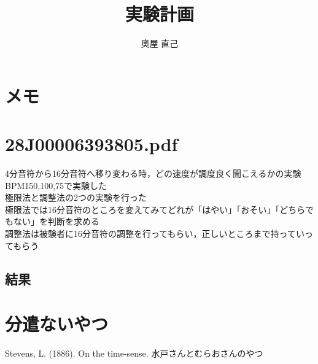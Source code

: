 \documentclass[twocolumn,10pt]{jarticle}
\title{実験計画}
\author{奥屋 直己}
\begin{document}
\maketitle

\section{メモ}
\section{28J00006393805.pdf}
4分音符から16分音符へ移り変わる時，どの速度が調度良く聞こえるかの実験\\
BPM150,100,75で実験した\\
極限法と調整法の2つの実験を行った\\
極限法では16分音符のところを変えてみてどれが「はやい」「おそい」「どちらでもない」を判断を求める\\
調整法は被験者に16分音符の調整を行ってもらい，正しいところまで持っていってもらう\\
\subsection{結果}
\section{分遣ないやつ}
Stevens, L. (1886). On the time-sense.
水戸さんとむらおさんのやつ
\end{document}
